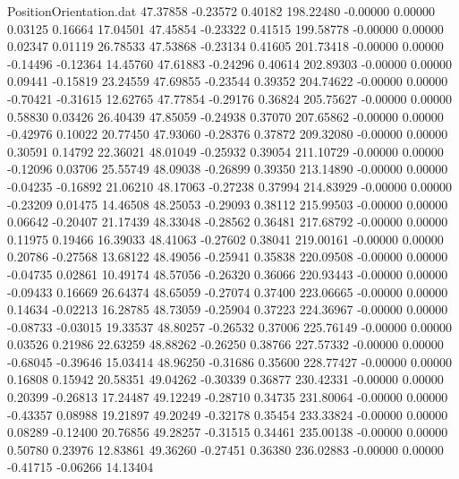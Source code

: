 \begin{filecontents}{PositionOrientation.dat}
  47.37858   -0.23572    0.40182   198.22480   -0.00000    0.00000    0.03125    0.16664   17.04501
  47.45854   -0.23322    0.41515   199.58778   -0.00000    0.00000    0.02347    0.01119   26.78533
  47.53868   -0.23134    0.41605   201.73418   -0.00000    0.00000   -0.14496   -0.12364   14.45760
  47.61883   -0.24296    0.40614   202.89303   -0.00000    0.00000    0.09441   -0.15819   23.24559
  47.69855   -0.23544    0.39352   204.74622   -0.00000    0.00000   -0.70421   -0.31615   12.62765
  47.77854   -0.29176    0.36824   205.75627   -0.00000    0.00000    0.58830    0.03426   26.40439
  47.85059   -0.24938    0.37070   207.65862   -0.00000    0.00000   -0.42976    0.10022   20.77450
  47.93060   -0.28376    0.37872   209.32080   -0.00000    0.00000    0.30591    0.14792   22.36021
  48.01049   -0.25932    0.39054   211.10729   -0.00000    0.00000   -0.12096    0.03706   25.55749
  48.09038   -0.26899    0.39350   213.14890   -0.00000    0.00000   -0.04235   -0.16892   21.06210
  48.17063   -0.27238    0.37994   214.83929   -0.00000    0.00000   -0.23209    0.01475   14.46508
  48.25053   -0.29093    0.38112   215.99503   -0.00000    0.00000    0.06642   -0.20407   21.17439
  48.33048   -0.28562    0.36481   217.68792   -0.00000    0.00000    0.11975    0.19466   16.39033
  48.41063   -0.27602    0.38041   219.00161   -0.00000    0.00000    0.20786   -0.27568   13.68122
  48.49056   -0.25941    0.35838   220.09508   -0.00000    0.00000   -0.04735    0.02861   10.49174
  48.57056   -0.26320    0.36066   220.93443   -0.00000    0.00000   -0.09433    0.16669   26.64374
  48.65059   -0.27074    0.37400   223.06665   -0.00000    0.00000    0.14634   -0.02213   16.28785
  48.73059   -0.25904    0.37223   224.36967   -0.00000    0.00000   -0.08733   -0.03015   19.33537
  48.80257   -0.26532    0.37006   225.76149   -0.00000    0.00000    0.03526    0.21986   22.63259
  48.88262   -0.26250    0.38766   227.57332   -0.00000    0.00000   -0.68045   -0.39646   15.03414
  48.96250   -0.31686    0.35600   228.77427   -0.00000    0.00000    0.16808    0.15942   20.58351
  49.04262   -0.30339    0.36877   230.42331   -0.00000    0.00000    0.20399   -0.26813   17.24487
  49.12249   -0.28710    0.34735   231.80064   -0.00000    0.00000   -0.43357    0.08988   19.21897
  49.20249   -0.32178    0.35454   233.33824   -0.00000    0.00000    0.08289   -0.12400   20.76856
  49.28257   -0.31515    0.34461   235.00138   -0.00000    0.00000    0.50780    0.23976   12.83861
  49.36260   -0.27451    0.36380   236.02883   -0.00000    0.00000   -0.41715   -0.06266   14.13404

\end{filecontents}
